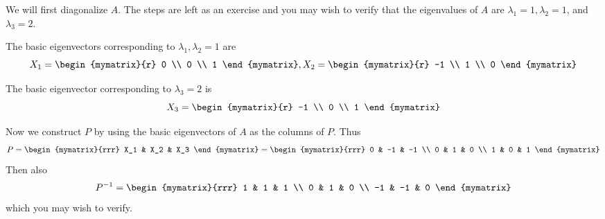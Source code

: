 \begin{solution}
We will first diagonalize $A$. The steps are left as an exercise and
you may wish to verify that the eigenvalues of $A$ are $\lambda_1 =1,
\lambda_2=1$, and $\lambda_3=2$.

The basic eigenvectors corresponding to $\lambda_1, \lambda_2 = 1$ are
\begin{equation*}
X_1 = \begin{mymatrix}{r}
0 \\
0 \\
1
\end{mymatrix} ,
X_2
=
\begin{mymatrix}{r}
-1 \\
1 \\
0
\end{mymatrix}
\end{equation*}

The basic eigenvector corresponding to $\lambda_3 = 2$ is
\begin{equation*}
X_3
=
\begin{mymatrix}{r}
-1 \\
0 \\
1
\end{mymatrix} 
\end{equation*}

Now we construct $P$ by using the basic eigenvectors of $A$ as the columns of $P$.
Thus
\begin{equation*}
P=
\begin{mymatrix}{rrr}
X_1 & X_2 & X_3
\end{mymatrix}
=
\begin{mymatrix}{rrr}
0 & -1 & -1 \\
0 & 1 & 0 \\
1 & 0 & 1
\end{mymatrix}
\end{equation*}
Then also
\begin{equation*}
P^{-1}=\begin{mymatrix}{rrr}
1 & 1 & 1 \\
0 & 1 & 0 \\
-1 & -1 & 0
\end{mymatrix}
\end{equation*}
which you may wish to verify.


\end{solution}

